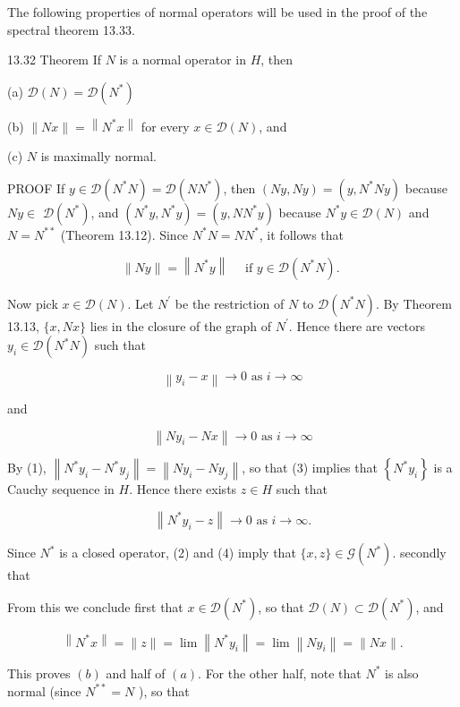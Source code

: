 \documentclass[10pt]{article}
\begin{document}
The following properties of normal operators will be used in the proof of the spectral theorem 13.33.

13.32 Theorem If $N$ is a normal operator in $H$, then

(a) $\mathscr{D}(N)=\mathscr{D}\left(N^{*}\right)$

(b) $\|N x\|=\left\|N^{*} x\right\|$ for every $x \in \mathscr{D}(N)$, and

(c) $N$ is maximally normal.

PROOF If $y \in \mathscr{D}\left(N^{*} N\right)=\mathscr{D}\left(N N^{*}\right)$, then $(N y, N y)=\left(y, N^{*} N y\right)$ because $N y \in$ $\mathscr{D}\left(N^{*}\right)$, and $\left(N^{*} y, N^{*} y\right)=\left(y, N N^{*} y\right)$ because $N^{*} y \in \mathscr{D}(N)$ and $N=N^{* *}$ (Theorem 13.12). Since $N^{*} N=N N^{*}$, it follows that

$$
\|N y\|=\left\|N^{*} y\right\| \quad \text { if } y \in \mathscr{D}\left(N^{*} N\right) \text {. }
$$

Now pick $x \in \mathscr{D}(N)$. Let $N^{\prime}$ be the restriction of $N$ to $\mathscr{D}\left(N^{*} N\right)$. By Theorem 13.13, $\{x, N x\}$ lies in the closure of the graph of $N^{\prime}$. Hence there are vectors $y_{i} \in \mathscr{D}\left(N^{*} N\right)$ such that

$$
\left\|y_{i}-x\right\| \rightarrow 0 \text { as } i \rightarrow \infty
$$

and

$$
\left\|N y_{i}-N x\right\| \rightarrow 0 \text { as } i \rightarrow \infty
$$

By (1), $\left\|N^{*} y_{i}-N^{*} y_{j}\right\|=\left\|N y_{i}-N y_{j}\right\|$, so that (3) implies that $\left\{N^{*} y_{i}\right\}$ is a Cauchy sequence in $H$. Hence there exists $z \in H$ such that

$$
\left\|N^{*} y_{i}-z\right\| \rightarrow 0 \text { as } i \rightarrow \infty .
$$

Since $N^{*}$ is a closed operator, (2) and (4) imply that $\{x, z\} \in \mathscr{G}\left(N^{*}\right)$. secondly that

From this we conclude first that $x \in \mathscr{D}\left(N^{*}\right)$, so that $\mathscr{D}(N) \subset \mathscr{D}\left(N^{*}\right)$, and

$$
\left\|N^{*} x\right\|=\|z\|=\lim \left\|N^{*} y_{i}\right\|=\lim \left\|N y_{i}\right\|=\|N x\| .
$$

This proves $(b)$ and half of $(a)$. For the other half, note that $N^{*}$ is also normal (since $N^{* *}=N$ ), so that
\end{document}
